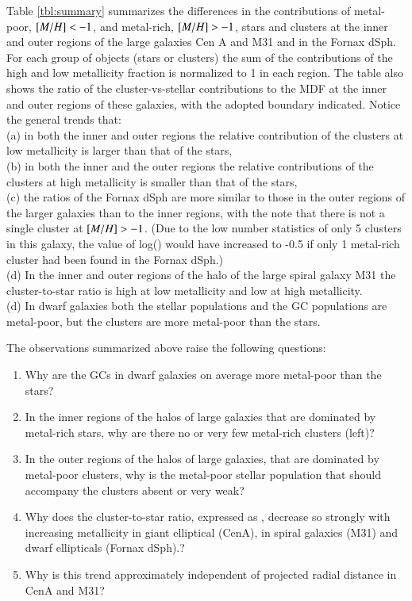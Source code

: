 \documentclass{aa}
\begin{document}
Table \ref{tbl:summary} summarizes the differences in the contributions of metal-poor, $\mbox{$[M/H]$} < -1$, and metal-rich,
$\mbox{$[M/H]$} > -1$, stars and clusters at the inner and outer regions of the large galaxies Cen A and M31 and in the Fornax dSph.
For each group of objects (stars or clusters) the sum of the contributions of the high and low metallicity
fraction is normalized to 1 in each region.
The table also shows the ratio of the cluster-vs-stellar contributions to the MDF at the
inner and outer regions of these galaxies, with the adopted boundary indicated. Notice the general trends that:\\ 
(a) in both the inner and outer regions the relative contribution of the clusters at low metallicity is 
larger than that of the stars, \\
(b) in both the inner and the outer regions the relative contributions of the clusters at high metallicity is 
smaller than that of the stars, \\
(c) the ratios of the Fornax dSph are more similar to those in the
outer regions of the larger galaxies than to the inner regions, with the note that there is not a single 
cluster at $\mbox{$[M/H]$} > -1$. (Due to the low number statistics of only 5 clusters in this galaxy, 
the value of log(\Rgcst) would have increased to 
-0.5 if only 1 metal-rich cluster had been found in the Fornax dSph.)\\ 
(d) In the inner and outer regions of the halo of the large spiral galaxy M31 the cluster-to-star ratio is high
at low metallicity and low at high metallicity.\\
(d) In dwarf galaxies both the stellar populations and the GC populations are metal-poor, but the clusters are more metal-poor than the stars. 


The observations summarized above raise the following questions:
\begin{enumerate}
\item[{\bf Q1.}] Why are the GCs in dwarf galaxies on average more metal-poor than the stars?
\item[{\bf Q2.}] In the inner regions of the halos of large galaxies that are dominated by metal-rich stars, 
why are there no or very few metal-rich clusters (left)? 
\item[{\bf Q3.}] In the outer regions of the halos of large galaxies, that are dominated by metal-poor clusters, 
why is the metal-poor stellar population that should accompany the clusters absent or very weak? 
\item[{\bf Q4.}] Why does the cluster-to-star ratio, expressed as \Rgcst, decrease so strongly with increasing metallicity in giant elliptical (CenA), in spiral galaxies (M31) and dwarf ellipticals 
(Fornax dSph).? 
\item[{\bf Q5.}] Why is this trend approximately independent of projected radial distance in CenA and M31?
\end{enumerate}
\end{document}
